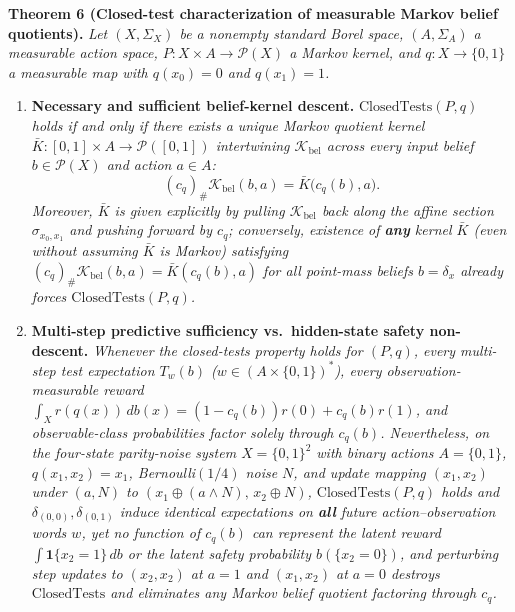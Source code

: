 \documentclass[11pt,a4paper]{article}
\newcounter{none}
\providecommand{\tightlist}{\setlength{\itemsep}{2pt}\setlength{\parskip}{0pt}}
\begin{document}
\textbf{Theorem 6 (Closed-test characterization of measurable Markov
belief quotients).} \emph{Let \((X, \Sigma_X)\) be a nonempty standard
Borel space, \((A, \Sigma_A)\) a measurable action space,
\(P: X \times A \to \mathcal{P}(X)\) a Markov kernel, and
\(q: X \to \{0,1\}\) a measurable map with \(q(x_0) = 0\) and
\(q(x_1) = 1\).}

\begin{enumerate}
\def\labelenumi{\arabic{enumi}.}
\tightlist
\item
  \textbf{Necessary and sufficient belief-kernel descent.}
  \emph{\(\mathrm{ClosedTests}(P, q)\) holds if and only if there exists
  a unique Markov quotient kernel
  \(\bar{K}: [0,1] \times A \to \mathcal{P}([0,1])\) intertwining
  \(\mathcal{K}_{\mathrm{bel}}\) across every input belief
  \(b \in \mathcal{P}(X)\) and action \(a \in A\):}
  \[(c_q)_\# \mathcal{K}_{\mathrm{bel}}(b, a) = \bar{K}\bigl(c_q(b), a\bigr).\]
  \emph{Moreover, \(\bar{K}\) is given explicitly by pulling
  \(\mathcal{K}_{\mathrm{bel}}\) back along the affine section
  \(\sigma_{x_0, x_1}\) and pushing forward by \(c_q\); conversely,
  existence of \textbf{any} kernel \(\bar{K}\) (even without assuming
  \(\bar{K}\) is Markov) satisfying
  \((c_q)_\# \mathcal{K}_{\mathrm{bel}}(b,a) = \bar{K}(c_q(b), a)\) for
  all point-mass beliefs \(b = \delta_x\) already forces
  \(\mathrm{ClosedTests}(P, q)\).}
\item
  \textbf{Multi-step predictive sufficiency vs.~hidden-state safety
  non-descent.} \emph{Whenever the closed-tests property holds for
  \((P, q)\), every multi-step test expectation \(T_w(b)\)
  (\(w \in (A \times \{0,1\})^*\)), every observation-measurable reward
  \(\int_X r(q(x))\, db(x) = (1 - c_q(b))r(0) + c_q(b)r(1)\), and
  observable-class probabilities factor solely through \(c_q(b)\).
  Nevertheless, on the four-state parity-noise system \(X = \{0,1\}^2\)
  with binary actions \(A = \{0,1\}\), \(q(x_1, x_2) = x_1\),
  Bernoulli\((1/4)\) noise \(N\), and update mapping \((x_1, x_2)\)
  under \((a, N)\) to \((x_1 \oplus (a \land N),\, x_2 \oplus N)\),
  \(\mathrm{ClosedTests}(P, q)\) holds and
  \(\delta_{(0,0)}, \delta_{(0,1)}\) induce identical expectations on
  \textbf{all} future action--observation words \(w\), yet no function
  of \(c_q(b)\) can represent the latent reward
  \(\int \mathbf{1}\{x_2 = 1\}\, db\) or the latent safety probability
  \(b(\{x_2 = 0\})\), and perturbing step updates to \((x_2, x_2)\) at
  \(a = 1\) and \((x_1, x_2)\) at \(a = 0\) destroys
  \(\mathrm{ClosedTests}\) and eliminates any Markov belief quotient
  factoring through \(c_q\).}
\end{enumerate}
\end{document}
